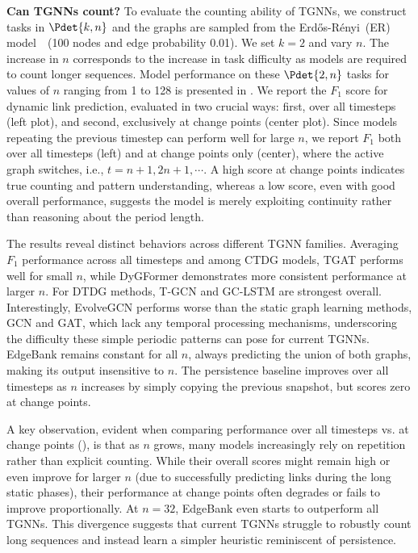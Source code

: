  \textbf{Can TGNNs count?} To evaluate the counting ability of TGNNs, we construct tasks in $\Pdet{k,n}$ and the graphs are sampled from the Erdős-Rényi~(ER) model~\citep{erdos1960evolution}~(100 nodes and edge probability 0.01). We set $k = 2$ and vary $n$. The increase in $n$ corresponds to the increase in task difficulty as models are required to count longer sequences. 
Model performance on these $\Pdet{2,n}$ tasks for values of $n$ ranging from 1 to 128 is presented in . We report the $F_1$ score for dynamic link prediction, evaluated in two crucial ways: first, over all timesteps (left plot), and second, exclusively at change points (center plot). 
Since models repeating the previous timestep can perform well for large $n$, we report $F_1$ both over all timesteps (left) and at change points only (center), where the active graph switches, i.e., $t = n+1, 2n+1, \cdots$. A high score at change points indicates true counting and pattern understanding, whereas a low score, even with good overall performance, suggests the model is merely exploiting continuity rather than reasoning about the period length.

 The results reveal distinct behaviors across different TGNN families. Averaging $F_1$ performance across all timesteps and among CTDG models, TGAT performs well for small $n$, while DyGFormer demonstrates more consistent performance at larger $n$. For DTDG methods, T-GCN and GC-LSTM are strongest overall. Interestingly, EvolveGCN performs worse than the static graph learning methods, GCN and GAT, which lack any temporal processing mechanisms, underscoring the difficulty these simple periodic patterns can pose for current TGNNs. EdgeBank remains constant for all $n$, always predicting the union of both graphs, making its output insensitive to $n$. The persistence baseline improves over all timesteps as $n$ increases by simply copying the previous snapshot, but scores zero at change points.

 A key observation, evident when comparing performance over all timesteps vs. at change points (), is that as $n$ grows, many models increasingly rely on repetition rather than explicit counting. While their overall scores might remain high or even improve for larger $n$ (due to successfully predicting links during the long static phases), their performance at change points often degrades or fails to improve proportionally. At $n = 32$, EdgeBank even starts to outperform all TGNNs. This divergence suggests that current TGNNs struggle to robustly count long sequences and instead learn a simpler heuristic reminiscent of persistence. %

